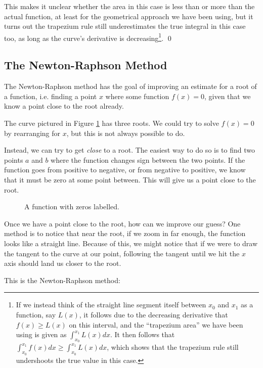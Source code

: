 \begin{solution}
    This makes it unclear whether the area in this case is less than or more than the actual function, at least for the geometrical approach we have been using, but it turns out the trapezium rule still underestimates the true integral in this case too, as long as the curve's derivative is decreasing\footnote{If we instead think of the straight line segment itself between $x_0$ and $x_1$ as a function, say $L(x)$, it follows due to the decreasing derivative that $f(x)\geq L(x)$ on this interval, and the ``trapezium area'' we have been using is given as $\int_{x_0}^{x_1}L(x)dx$. It then follows that $\int_{x_0}^{x_1}f(x)dx \geq\int_{x_0}^{x_1}L(x)dx$, which shows that the trapezium rule still undershoots the true value in this case.}.
    \qed
\end{solution}


\subsection{The Newton-Raphson Method}
The Newton-Raphson method has the goal of improving an estimate for a root of a function, i.e. finding a point $x$ where some function $f(x) = 0$, given that we know a point close to the root already.

The curve pictured in Figure \ref{fig:function-with-zeros-labelled} has three roots. We could try to solve $f(x) = 0$ by rearranging for $x$, but this is not always possible to do.

Instead, we can try to get \emph{close} to a root. The easiest way to do so is to find two points $a$ and $b$ where the function changes sign between the two points. If the function goes from positive to negative, or from negative to positive, 
we know that it must be zero at some point between. This will give us a point close to the root.

\begin{figure}[H]
\centering
{}
\caption{A function with zeros labelled.}
\label{fig:function-with-zeros-labelled}
\end{figure}

Once we have a point close to the root, how can we improve our guess? One method is to notice that near the root, if we zoom in far enough, the function looks like a straight line. Because of this, 
we might notice that if we were to draw the tangent to the curve at our point, following the tangent until we hit the $x$ axis should land us closer to the root.

This is the Newton-Raphson method: 

